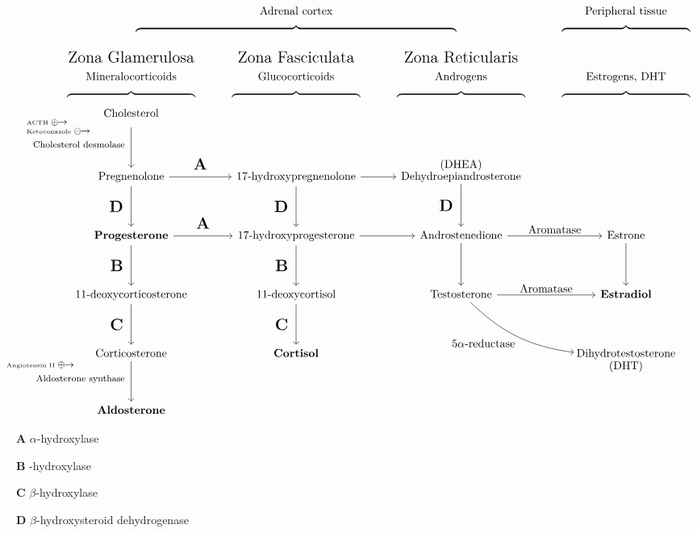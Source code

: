 \documentclass[12pt]{article}
\begin{document}
\pagestyle{empty}
\newcommand\headsub[3]{$\overbrace{\displaystyle\hspace{2cm}\mathclap{\text{#3}}\hspace{2cm}\vphantom{\sum^\infty}}^{\overset{\displaystyle\text{\Large #1}}{\displaystyle\text{#2}\vphantom{\int}}}$}
\newcommand\stackthree[3]{$\smash{\overset{\mathclap{\textstyle\text{\tiny#1}\phantom{\text{\tiny#2}}}}{\overset{\mathclap{\text{\tiny#2}\phantom{\text{\tiny#1}}}}{\displaystyle\vphantom{\sum}\text{\footnotesize#3}}}}$}


\[\begin{tikzcd}[math mode = false, row sep = .5in]
{}& $\mathclap{\overbrace{\hspace{10cm}}^{\displaystyle\text{Adrenal cortex}\vphantom\int}}$
&& $\mathclap{\overbrace{\hspace{4cm}}^{\displaystyle\text{Peripheral tissue}\vphantom\int}}$
\\[-.4in] \headsub{Zona Glamerulosa}{Mineralocorticoids}{Cholesterol}
	\ar{d}[swap]{\stackthree{ACTH~\footnotesize$\oplus\!\!\to$}{Ketoconazole~\footnotesize$\ominus\!\!\to$}{Cholesterol desmolase} \quad} 
&\headsub{Zona Fasciculata}{Glucocorticoids}{}
&\headsub{Zona Reticularis}{Androgens}{}
&\headsub{}{Estrogens, DHT}{}
\\Pregnenolone 
	\ar{d}[swap]{\Large\textbf D \quad}%
	\ar{r}[outer sep = 1ex]{\Large\textbf A}%
&17-hydroxypregnenolone
	\dar[swap]{\Large\textbf D \quad}
	\rar
& $\smash{\overset{\textstyle\text{(DHEA)}}{\text{Dehydroepiandrosterone}}}$
	\dar[swap]{\Large\textbf D \quad}
\\\bf Progesterone
	\ar{d}[swap]{\Large\textbf B \quad}%
	\ar{r}[outer sep = 1ex]{\Large\textbf A}%
&17-hydroxyprogesterone
	\dar[swap]{\Large\textbf B \quad}
	\rar
& Androstenedione
	\dar
	\rar{Aromatase}
& Estrone
	\dar
\\11-deoxycorticosterone 
	\ar{d}[swap]{\Large\textbf C \quad}%
&11-deoxycortisol
	\dar[swap]{\Large\textbf C \quad}
& Testosterone
	\rar{Aromatase}
	\ar[swap,bend right=18]{dr}{5$\textstyle\alpha$-reductase}
&\bf Estradiol
\\Corticosterone 
	\ar{d}[swap]{\stackthree{\hspace{2.5cm}}{Angiotensin~II~\footnotesize$\oplus\!\!\to$}{Aldosterone synthase} \quad}
&\bf Cortisol
&& $\smash{\underset{\textstyle\text{(DHT)}}{\text{Dihydrotestosterone}}}$
\\\bf Aldosterone
\end{tikzcd}\]

\vspace{13mm}\Large

\noindent\hspace{15mm}\textbf A $\alpha$-hydroxylase

\noindent\hspace{15mm}\textbf B -hydroxylase

\noindent\hspace{15mm}\textbf C $\textstyle\beta$-hydroxylase

\noindent\hspace{15mm}\textbf D $\beta$-hydroxysteroid dehydrogenase
\end{document}
